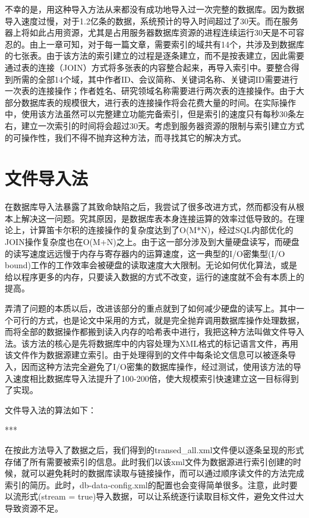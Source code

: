 不幸的是，用这种导入方法从来都没有成功地导入过一次完整的数据库。因为数据导入速度过慢，对于1.2亿条的数据，系统预计的导入时间超过了30天。而在服务器上将如此占用资源，尤其是占用服务器数据库资源的进程连续运行30天是不可容忍的。由上一章可知，对于每一篇文章，需要索引的域共有14个，共涉及到数据库的七张表。由于该方法的索引建立的过程是逐条建立，而不是按表建立，因此需要通过表的连接（JOIN）方式将多张表的内容整合起来，再导入索引中。要整合得到所需的全部14个域，其中作者ID、会议简称、关键词名称、关键词ID需要进行一次表的连接操作；作者姓名、研究领域名称需要进行两次表的连接操作。由于大部分数据库表的规模很大，进行表的连接操作将会花费大量的时间。在实际操作中，使用该方法虽然可以完整建立功能完备索引，但是索引的速度只有每秒30条左右，建立一次索引的时间将会超过30天。考虑到服务器资源的限制与索引建立方式的可操作性，我们不得不抛弃这种方法，而寻找其它的解决方式。

\section{文件导入法}
在数据库导入法暴露了其致命缺陷之后，我尝试了很多改进方式，然而都没有从根本上解决这一问题。究其原因，是数据库表本身连接运算的效率过低导致的。在理论上，计算笛卡尔积的连接操作的复杂度达到了O(M*N)，经过SQL内部优化的JOIN操作复杂度也在O(M+N)之上。由于这一部分涉及到大量硬盘读写，而硬盘的读写速度远远慢于内存与寄存器内的运算速度，这一典型的I/O密集型(I/O bound)工作的工作效率会被硬盘的读取速度大大限制。无论如何优化算法，或是给以程序更多的内存，只要读入数据的方式不改变，运行的速度就不会有本质上的提高。

弄清了问题的本质以后，改进该部分的重点就到了如何减少硬盘的读写上。其中一个可行的方式，也是论文中采用的方式，就是完全抛弃调用数据库操作处理数据，而将全部的数据操作都搬到读入内存的哈希表中进行，我把这种方法叫做文件导入法。该方法的核心是先将数据库中的内容处理为XML格式的标记语言文件，再用该文件作为数据源建立索引。由于处理得到的文件中每条论文信息可以被逐条导入，因而这种方法完全避免了I/O密集的数据库操作，经过测试，使用该方法的导入速度相比数据库导入法提升了100-200倍，使大规模索引快速建立这一目标得到了实现。

文件导入法的算法如下：

***

在按此方法导入了数据之后，我们得到的transed\_all.xml文件便以逐条呈现的形式存储了所有需要被索引的信息。此时我们以该xml文件为数据源进行索引创建的时候，就可以避免耗时的数据库读取与链接操作，而可以通过顺序读文件的方法完成索引的简历。此时，db-data-config.xml的配置也会变得简单很多。注意，此时要以流形式(stream = true)导入数据，可以让系统逐行读取目标文件，避免文件过大导致资源不足。

